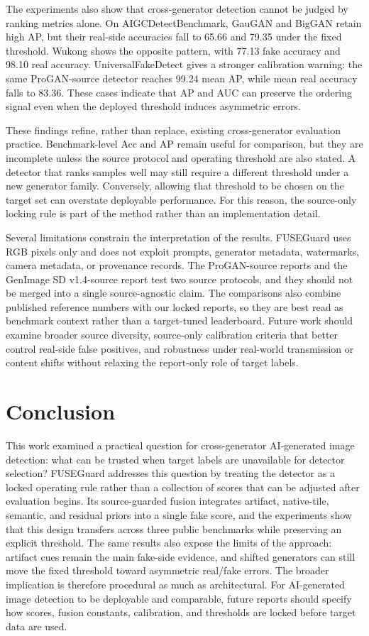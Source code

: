 \documentclass[lettersize,journal]{IEEEtran}
\begin{document}
The experiments also show that cross-generator detection cannot be judged by ranking metrics alone. On AIGCDetectBenchmark, GauGAN and BigGAN retain high AP, but their real-side accuracies fall to 65.66 and 79.35 under the fixed threshold. Wukong shows the opposite pattern, with 77.13 fake accuracy and 98.10 real accuracy. UniversalFakeDetect gives a stronger calibration warning: the same ProGAN-source detector reaches 99.24 mean AP, while mean real accuracy falls to 83.36. These cases indicate that AP and AUC can preserve the ordering signal even when the deployed threshold induces asymmetric errors.

These findings refine, rather than replace, existing cross-generator evaluation practice. Benchmark-level Acc and AP remain useful for comparison, but they are incomplete unless the source protocol and operating threshold are also stated. A detector that ranks samples well may still require a different threshold under a new generator family. Conversely, allowing that threshold to be chosen on the target set can overstate deployable performance. For this reason, the source-only locking rule is part of the method rather than an implementation detail.

Several limitations constrain the interpretation of the results. FUSEGuard uses RGB pixels only and does not exploit prompts, generator metadata, watermarks, camera metadata, or provenance records. The ProGAN-source reports and the GenImage SD v1.4-source report test two source protocols, and they should not be merged into a single source-agnostic claim. The comparisons also combine published reference numbers with our locked reports, so they are best read as benchmark context rather than a target-tuned leaderboard. Future work should examine broader source diversity, source-only calibration criteria that better control real-side false positives, and robustness under real-world transmission or content shifts without relaxing the report-only role of target labels.

\section{Conclusion}
\label{sec:conclusion}
This work examined a practical question for cross-generator AI-generated image detection: what can be trusted when target labels are unavailable for detector selection? FUSEGuard addresses this question by treating the detector as a locked operating rule rather than a collection of scores that can be adjusted after evaluation begins. Its source-guarded fusion integrates artifact, native-tile, semantic, and residual priors into a single fake score, and the experiments show that this design transfers across three public benchmarks while preserving an explicit threshold. The same results also expose the limits of the approach: artifact cues remain the main fake-side evidence, and shifted generators can still move the fixed threshold toward asymmetric real/fake errors. The broader implication is therefore procedural as much as architectural. For AI-generated image detection to be deployable and comparable, future reports should specify how scores, fusion constants, calibration, and thresholds are locked before target data are used.
\end{document}
